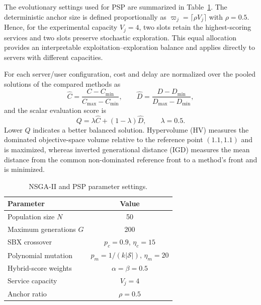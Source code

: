 \documentclass[10pt, conference, letterpaper]{IEEEtran}
\newif\ifshowrevisions
\newenvironment{revision}{\begingroup\color{blue}}{\endgroup}
\newenvironment{revision}{\begingroup}{\endgroup}
\newcommand{\revcolor}{\ifshowrevisions\color{blue}\fi}
\begin{document}
\begin{revision}
The evolutionary settings used for PSP are summarized in Table~\ref{tab:psp_parameters}. The deterministic anchor size is defined proportionally as $\varpi_j=\lceil\rho V_j\rceil$ with $\rho=0.5$. Hence, for the experimental capacity $V_j=4$, two slots retain the highest-scoring services and two slots preserve stochastic exploration. This equal allocation provides an interpretable exploitation--exploration balance and applies directly to servers with different capacities.

For each server/user configuration, cost and delay are normalized over the pooled solutions of the compared methods as
\begin{equation}
\widehat{C}=\frac{C-C_{\min}}{C_{\max}-C_{\min}},\qquad
\widehat{D}=\frac{D-D_{\min}}{D_{\max}-D_{\min}},
\label{eq:q_normalization}
\end{equation}
and the scalar evaluation score is
\begin{equation}
Q=\lambda\widehat{C}+(1-\lambda)\widehat{D},\qquad \lambda=0.5.
\label{eq:q_score}
\end{equation}
Lower $Q$ indicates a better balanced solution. Hypervolume (HV) measures the dominated objective-space volume relative to the reference point $(1.1,1.1)$ and is maximized, whereas inverted generational distance (IGD) measures the mean distance from the common non-dominated reference front to a method's front and is minimized.
\end{revision}

\begin{table}[!t]
\centering
\revcolor
\caption{NSGA-II and PSP parameter settings.}
\label{tab:psp_parameters}
\small
\begin{tabular}{|l|c|}
\hline
Parameter & Value \\ \hline
Population size $N$ & 50 \\ \hline
Maximum generations $G$ & 200 \\ \hline
SBX crossover & $p_c=0.9$, $\eta_c=15$ \\ \hline
Polynomial mutation & $p_m=1/(k|\mathcal{S}|)$, $\eta_m=20$ \\ \hline
Hybrid-score weights & $\alpha=\beta=0.5$ \\ \hline
Service capacity & $V_j=4$ \\ \hline
Anchor ratio & $\rho=0.5$ \\ \hline
\end{tabular}
\end{table}
\end{document}
